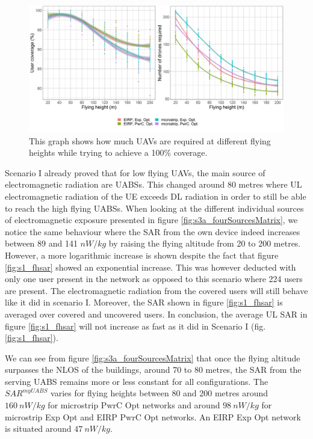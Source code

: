 \begin{figure}[]
  \includegraphics[width=\textwidth]{../results/s3/fhvsnumdronesAndCov.png}
  \caption{This graph shows how much \acs{UAV}s are required at different flying heights while trying to achieve a 100\% coverage.}
  \label{fig:s3a_numDronesAndCov}
\end{figure}

Scenario I already proved that for low flying \gls{UAV}s, the main source of electromagnetic radiation are \gls{UABS}s. 
This changed around 80 metres where \gls{UL} electromagnetic radiation of the \gls{UE}
exceeds \gls{DL} radiation in order to still be able to reach the high flying \gls{UABS}s. 
When looking at the different individual sources of electromagnetic exposure presented in figure \ref{fig:s3a_fourSourcesMatrix}, 
we notice the same behaviour where the 
 \gls{SAR} from the own device indeed increases between 89 and 141 $nW/kg$ by raising the flying altitude from 
 20 to 200 metres.
  However, a more logarithmic increase is shown
  despite the fact that figure \ref{fig:s1_fhsar} showed an exponential increase.
This was however deducted with only one user present in the network as opposed to this scenario 
where 224 users are present. 
The electromagnetic radiation from the covered users will still behave like it did in scenario I.
Moreover, the \gls{SAR} shown in figure  \ref{fig:s1_fhsar} is averaged  over covered and uncovered users.
In conclusion, the average  \gls{UL} \gls{SAR} in  figure \ref{fig:s1_fhsar} will not increase as fast as it did
in Scenario I (fig. \ref{fig:s1_fhsar}).

We can see from figure \ref{fig:s3a_fourSourcesMatrix} that once the flying altitude surpasses the \gls{NLOS} of the buildings, 
around 70 to 80 metres, the SAR from the serving \gls{UABS} remains 
more or less constant for all configurations.
The $SAR^{myUABS}$ varies for flying heights between 80 and 200 metres
around $160\ nW/kg$ for microstrip \gls{PwrC Opt} networks and around $98\ nW/kg$ for microstrip \gls{Exp Opt} and \gls{EIRP} \gls{PwrC Opt} networks.
An \gls{EIRP} \gls{Exp Opt} network is situated around $47\ nW/kg$.

